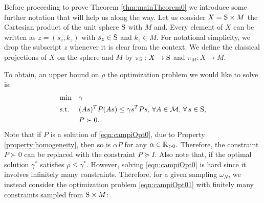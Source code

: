 

Before proceeding to prove Theorem \ref{thm:mainTheorem0} we introduce some further notation that will help us along the way. Let us consider $X = \text{S} \times M$ the Cartesian product of the unit sphere $\text{S}$ with $M$ and. Every element of $X$ can be written as $z = (s_z, k_z)$ with $s_z \in \text{S}$ and $k_z \in M$. For notational simplicity, we drop the subscript $z$ whenever it is clear from the context. We define the classical projections of $X$ on the sphere and $M$ by $\pi_{\text{S}}: X \to \text{S}$ and $\pi_M: X \to M$.

To obtain, an upper bound on $\rho$ the optimization problem we would like to solve is:
\begin{equation}\label{eqn:campiOpt0}
\begin{aligned}
& \text{min} & & \gamma \\
& \text{s.t.} 
&  & (As)^TP(As) \leq \gamma s^TPs,\,\forall A \in \mathcal{M}, \,\forall\, s \in \text{S},\\
& && P \succ 0. \\
\end{aligned}
\end{equation}
Note that if $P$ is a solution of \eqref{eqn:campiOpt0}, due to Property \ref{property:homogeneity}, then so is $\alpha P$ for any $\alpha \in \mathbb{R}_{> 0}.$ Therefore, the constraint $P \succ 0$ can be replaced with the constraint $P \succeq I$. Also note that, if the optimal solution $\gamma^*$ satisfies $\rho \leq \gamma^*$. However, solving \eqref{eqn:campiOpt0} is hard since it involves infinitely many constraints. Therefore, for a given sampling $\omega_N$, we instead consider the optimization problem \eqref{eqn:campiOpt01} with finitely many constraints sampled from $\text{S} \times M$: 

